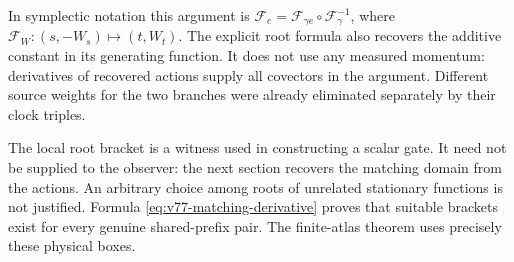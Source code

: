 In symplectic notation this argument is
$\mathcal F_e=\mathcal F_{\gamma e}\circ\mathcal F_\gamma^{-1}$,
where $\mathcal F_W:(s,-W_s)\mapsto(t,W_t)$.  The explicit root
formula also recovers the additive constant in its generating function.
It does not use any measured momentum: derivatives of recovered actions
supply all covectors in the argument.  Different source weights for the
two branches were already eliminated separately by their clock triples.

The local root bracket is a witness used in constructing a scalar
gate.  It need not be supplied to the observer: the next section
recovers the matching domain from the actions.  An arbitrary choice
among roots of unrelated stationary functions is not justified.
Formula \eqref{eq:v77-matching-derivative} proves that suitable brackets
exist for every genuine shared-prefix pair.  The finite-atlas theorem
uses precisely these physical boxes.

